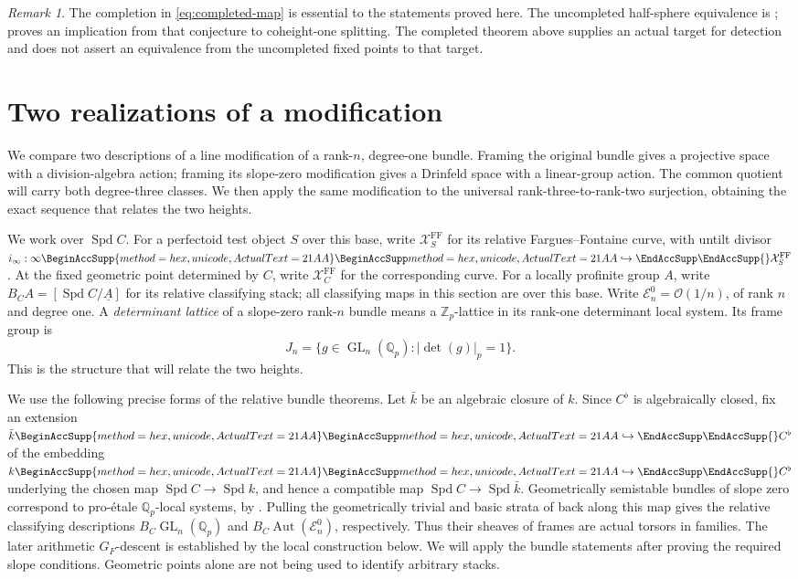 \documentclass[11pt]{article}
\numberwithin{equation}{section}
\theoremstyle{definition}
\theoremstyle{remark}
\newtheorem{remark}[theorem]{Remark}
\newcommand{\Q}{\mathbb Q}
\newcommand{\Z}{\mathbb Z}
\newcommand{\cO}{\mathcal O}
\DeclareMathOperator{\GL}{GL}
\DeclareMathOperator{\Aut}{Aut}
\DeclareMathOperator{\Spd}{Spd}
\let\UnicodeOriginalHookrightarrow\hookrightarrow
\DeclareRobustCommand{\hookrightarrow}{
  \BeginAccSupp{method=hex,unicode,ActualText=21AA}
  \UnicodeOriginalHookrightarrow\EndAccSupp{}}
\begin{document}
\begin{remark}
The completion in \eqref{eq:completed-map} is essential to the statements
proved here.  The uncompleted half-sphere equivalence is
\cite[Conjectures 1.1.1 and 5.1.13]{BMR2026};
\cite[Proposition 5.1.17]{BMR2026} proves an implication from that
conjecture to coheight-one splitting.  The completed theorem above
supplies an actual target for detection and does not assert an
equivalence from the uncompleted fixed points to that target.
\end{remark}

\section{Two realizations of a modification}\label{sec:modifications}

We compare two descriptions of a line modification of a rank-$n$,
degree-one bundle. Framing the original bundle gives a projective
space with a division-algebra action; framing its slope-zero
modification gives a Drinfeld space with a linear-group action.
The common quotient will carry both degree-three classes. We then
apply the same modification to the universal rank-three-to-rank-two
surjection, obtaining the exact sequence that relates the two heights.

We work over $\Spd C$.  For a perfectoid test object $S$ over this
base, write $\mathcal X_S^{\mathrm{FF}}$ for its relative
Fargues--Fontaine curve, with untilt divisor
$i_\infty:\infty\hookrightarrow\mathcal X_S^{\mathrm{FF}}$.
At the fixed geometric point determined by $C$, write
$\mathcal X_C^{\mathrm{FF}}$ for the corresponding curve.
For a locally profinite group $A$, write
$B_CA=[\Spd C/\underline A]$ for its relative classifying stack;
all classifying maps in this section are over this base.
Write $\mathcal E_n^0=\cO(1/n)$, of rank $n$ and degree one.
A \emph{determinant lattice} of a slope-zero rank-$n$ bundle means a
$\Z_p$-lattice in its rank-one determinant local system.
Its frame group is
\[
 J_n=\{g\in\GL_n(\Q_p):|\det(g)|_p=1\}.
\]
This is the structure that will relate the two heights.

We use the following precise forms of the relative bundle theorems.
Let $\bar k$ be an algebraic closure of $k$.  Since $C^\flat$ is
algebraically closed, fix an extension $\bar k\hookrightarrow C^\flat$
of the embedding $k\hookrightarrow C^\flat$ underlying the chosen map
$\Spd C\to\Spd k$, and hence a compatible map
$\Spd C\to\Spd\bar k$.  Geometrically semistable bundles of slope zero
correspond to pro-\'etale $\Q_p$-local systems, by
\cite[Theorem II.2.19 and Corollary II.2.20]{FS}.
Pulling the geometrically trivial and basic strata of
\cite[Theorems III.2.4 and III.4.5]{FS} back along this map gives the
relative classifying descriptions $B_C\GL_n(\Q_p)$ and
$B_C\Aut(\mathcal E_n^0)$, respectively.
Thus their sheaves of frames are actual torsors in families.
The later arithmetic $G_F$-descent is established by the local
construction below.  We will apply the bundle statements after proving
the required slope conditions.  Geometric points alone are not being
used to identify arbitrary stacks.
\end{document}
